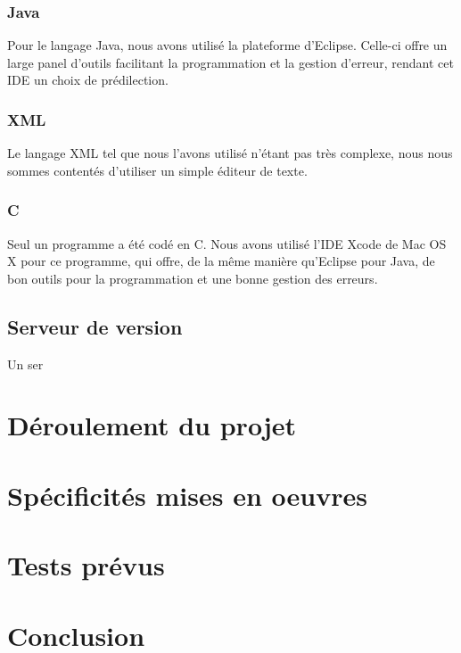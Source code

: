 		\subsection{Java}
		Pour le langage Java, nous avons utilisé la plateforme d'Eclipse. Celle-ci offre un large panel d'outils facilitant la programmation et la gestion d'erreur, rendant cet IDE un choix de prédilection.
		
		\subsection{XML}
		Le langage XML tel que nous l'avons utilisé n'étant pas très complexe, nous nous sommes contentés d'utiliser un simple éditeur de texte.
	
		\subsection{C} 
		Seul un programme a été codé en C. Nous avons utilisé l'IDE Xcode de Mac OS X pour ce programme, qui offre, de la même manière qu'Eclipse pour Java, de bon outils pour la programmation et une bonne gestion des erreurs.
		
		
		
		\section{Serveur de version}
		
		Un ser

		\chapter{Déroulement du projet}

		\chapter{Spécificités mises en oeuvres}

		\chapter{Tests prévus}

		\chapter{Conclusion}
